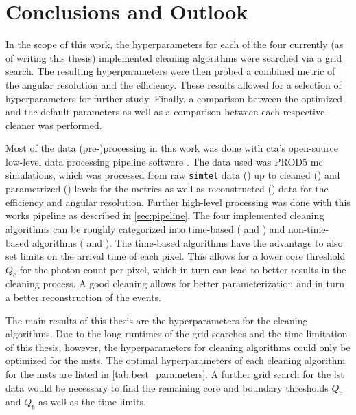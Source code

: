 \vspace{-1.5cm}
\chapter{Conclusions and Outlook}
\label{ch:conclusions}
\vspace{-0.5cm}
In the scope of this work, the hyperparameters for each of the four currently (as of writing this thesis)
implemented cleaning algorithms were searched via a grid search. The resulting hyperparameters were then
probed \wrt a combined metric of the angular resolution and the efficiency. These results allowed for a
selection of hyperparameters for further study. Finally, a comparison between the optimized and the default
parameters as well as a comparison between each respective cleaner was performed.

Most of the data (pre-)processing in this work was done with \gls{cta}'s open-source low-level data processing pipeline
software \ctapipe{}. The data used was PROD5 \gls{mc} simulations, which was processed from raw \texttt{simtel} data
(\rzero) up to cleaned (\dloa) and parametrized (\dlob) levels for the metrics as well as reconstructed (\dlt) data for
the efficiency and angular resolution. Further high-level processing was done with this works pipeline as described in
\autoref{sec:pipeline}. The four implemented cleaning algorithms can be roughly categorized into time-based (\fact{} and \tcc) and non-time-based
algorithms (\tailcuts{} and \mars{}). The time-based algorithms have the advantage to also set limits on the arrival time of each pixel. This allows
for a lower core threshold \(Q_c\) for the photon count per pixel, which in turn can lead to better
results in the cleaning process. A good cleaning allows for better parameterization and in turn
a better reconstruction of the events.

The main results of this thesis are the hyperparameters for the cleaning algorithms.
Due to the long runtimes of the grid searches and the time limitation of this thesis, however, the hyperparameters
for cleaning algorithms could only be optimized for the \glspl{mst}. The optimal hyperparameters of each cleaning algorithm for
the \glspl{mst} are listed in \autoref{tab:best_parameters}. A further grid search for the \gls{lst}
data would be necessary to find the remaining core and boundary thresholds \(Q_c\) and \(Q_b\) as well
as the time limits.

